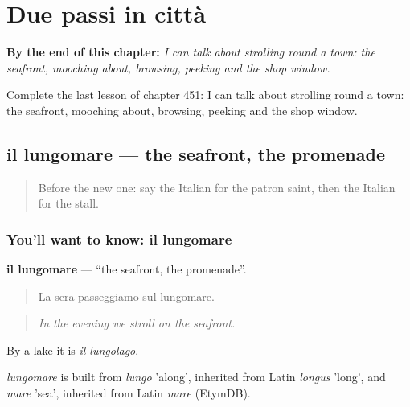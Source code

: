 
\chapter{Due passi in città}
\label{ch:it-due-passi-in-citta}

\begin{chapteropening}
\textbf{By the end of this chapter:} \emph{I can talk about strolling round a town: the seafront, mooching about, browsing, peeking and the shop window.}

Complete the last lesson of chapter 451: I can talk about strolling round a town: the seafront, mooching about, browsing, peeking and the shop window.
\end{chapteropening}

\section[il lungomare]{il lungomare — the seafront, the promenade}

\label{lesson:IT-C451-lungomare}



\begin{quote}
Before the new one: say the Italian for the patron saint, then the Italian for the stall.
\end{quote}

\subsection*{You'll want to know: il lungomare}
\textbf{il lungomare} — \textquotedblleft{}the seafront, the promenade\textquotedblright{}.

\begin{quote}
La sera passeggiamo sul lungomare.
\end{quote}

\begin{quote}
\emph{In the evening we stroll on the seafront.}
\end{quote}

By a lake it is \emph{il lungolago}.

\begin{cousinweb}
\emph{lungomare} is built from \emph{lungo} 'along', inherited from Latin \emph{longus} 'long', and \emph{mare} 'sea', inherited from Latin \emph{mare} (EtymDB).
\end{cousinweb}

